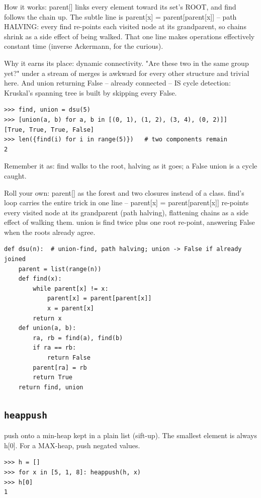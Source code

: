 \documentclass[10pt,letterpaper]{book}
\begin{document}
How it works: parent[] links every element toward its set's ROOT, and find follows the chain up. The subtle line is parent[x] = parent[parent[x]] -- path HALVING: every find re-points each visited node at its grandparent, so chains shrink as a side effect of being walked. That one line makes operations effectively constant time (inverse Ackermann, for the curious).


Why it earns its place: dynamic connectivity. "Are these two in the same group yet?" under a stream of merges is awkward for every other structure and trivial here. And union returning False -- already connected -- IS cycle detection: Kruskal's spanning tree is built by skipping every False.

\begin{lstlisting}[style=ex]
>>> find, union = dsu(5)
>>> [union(a, b) for a, b in [(0, 1), (1, 2), (3, 4), (0, 2)]]
[True, True, True, False]
>>> len({find(i) for i in range(5)})   # two components remain
2
\end{lstlisting}

Remember it as: find walks to the root, halving as it goes; a False union is a cycle caught.


Roll your own: parent[] as the forest and two closures instead of a class. find's loop carries the entire trick in one line -- parent[x] = parent[parent[x]] re-points every visited node at its grandparent (path halving), flattening chains as a side effect of walking them. union is find twice plus one root re-point, answering False when the roots already agree.

\begin{lstlisting}[style=ex]
def dsu(n):  # union-find, path halving; union -> False if already joined
    parent = list(range(n))
    def find(x):
        while parent[x] != x:
            parent[x] = parent[parent[x]]
            x = parent[x]
        return x
    def union(a, b):
        ra, rb = find(a), find(b)
        if ra == rb:
            return False
        parent[ra] = rb
        return True
    return find, union
\end{lstlisting}
\subsection{\texttt{heappush}}\label{def:heappush}
push onto a min-heap kept in a plain list (sift-up). The smallest element is always h[0]. For a MAX-heap, push negated values.
\begin{lstlisting}[style=ex]
>>> h = []
>>> for x in [5, 1, 8]: heappush(h, x)
>>> h[0]
1
\end{lstlisting}
\end{document}
